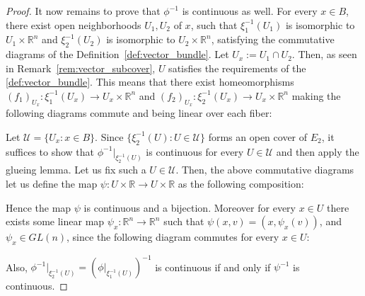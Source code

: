 \begin{proof}
It now remains to prove that $\phi^{-1}$ is continuous as well. For every $x\in B$, there exist open neighborhoods $U_1,U_2$ of $x$, such that $\xi_1^{-1}(U_1)$ is isomorphic to $U_1\times\mathbb{R}^n$ and $\xi_2^{-1}(U_2)$ is isomorphic to $U_2\times\mathbb{R}^n$, satisfying the commutative diagrams of the Definition~\ref{def:vector_bundle}. Let $U_x:=U_1\cap U_2$. Then, as seen in Remark~\ref{rem:vector_subcover}, $U$ satisfies the requirements of the \ref{def:vector_bundle}. This means that there exist homeomorphisms $(f_1)_{U_x}:\xi_1^{-1}(U_x)\to U_x\times\mathbb{R}^n$ and $(f_2)_{U_x}:\xi_2^{-1}(U_x)\to U_x\times\mathbb{R}^n$ making the following diagrams commute and being linear over each fiber:
\begin{center}
\end{center}
Let $\mathcal{U}=\{U_x:x\in B\}$. Since $\{\xi_2^{-1}(U):U\in\mathcal{U}\}$ forms an open cover of $E_2$, it suffices to show that $\phi^{-1}|_{\xi_2^{-1}(U)}$ is continuous for every $U\in\mathcal{U}$ and then apply the glueing lemma. Let us fix such a $U\in\mathcal{U}$. Then, the above commutative diagrams let us define the map $\psi:U\times\mathbb{R}\to U\times\mathbb{R}$ as the following composition:
\vspace*{-1em}
\begin{center}
\end{center}
Hence the map $\psi$ is continuous and a bijection. Moreover for every $x\in U$ there exists some linear map $\psi_x:\mathbb{R}^n\to\mathbb{R}^n$ such that $\psi(x,v)=(x,\psi_x(v))$, and $\psi_x\in GL(n)$, since the following diagram commutes for every $x\in U$:
\vspace*{-1em}
\begin{center}
\end{center}
Also, $\phi^{-1}|_{\xi_2^{-1}(U)}=(\phi|_{\xi_1^{-1}(U)})^{-1}$ is continuous if and only if $\psi^{-1}$ is continuous.


\end{proof}
